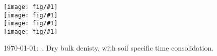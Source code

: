 \documentclass[a4paper]{article}
\newcommand{\figright}[1]{\texttt{[image: fig/\#1]}}
\newcommand{\figctop}[1]{\hspace*{-1cm}\figright{#1}}
\newcommand{\figc}[1]{\vspace*{-1.5cm}\figctop{#1}}
\newcommand{\MyID}{\today:~}
\begin{document}
\pagestyle{empty}


\begin{figure}[htbp]
  \begin{center}
    \figctop{rho_b_L1} \\
    \figc{rho_b_L2} \\
    \figc{rho_b_L3} \\
    \figc{rho_b_L4}
  \end{center}
  \caption{\MyID{}. Dry bulk denisty, with soil specific time consolidation.}
  \label{fig:rho_b_original}
\end{figure}
\end{document}
